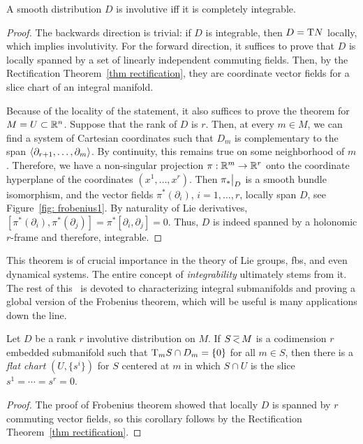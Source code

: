 \begin{thm}\label{thm frobenius}
    A smooth distribution $D$ is involutive iff it is completely integrable.
\end{thm}
\begin{proof}
    The backwards direction is trivial: if $D$ is integrable, then $D=\mathrm{T} N$ locally, which implies involutivity.
    For the forward direction, it suffices to prove that $D$ is locally spanned by a set of linearly independent commuting fields. Then, by the Rectification Theorem~\ref{thm rectification}, they are coordinate vector fields for a slice chart of an integral manifold.

    Because of the locality of the statement, it also suffices to prove the theorem for $M=U\subset \mathbb{R}^n$. Suppose that the rank of $D$ is $r$. Then, at every $m\in M$, we can find a system of Cartesian coordinates such that $D_m$ is complementary to the span $\langle\partial_{r+1},\ldots,\partial_m\rangle$. By continuity, this remains true on some neighborhood of $m$. Therefore, we have a non-singular projection $\pi:\mathbb{R}^m\to\mathbb{R}^r$ onto the coordinate hyperplane of the coordinates $(x^1,\ldots,x^r)$. Then $\restr{\pi_\ast}{D}$ is a smooth bundle isomorphism, and the vector fields $\pi^\ast(\partial_i)$, $i=1,\ldots,r$, locally span $D$, see Figure~\ref{fig: frobenius1}. By naturality of Lie derivatives, $[\pi^\ast(\partial_i),\pi^\ast(\partial_j)]=\pi^\ast[\partial_i,\partial_j]=0.$
    Thus, $D$ is indeed spanned by a holonomic $r$-frame and therefore, integrable.
\end{proof}

This theorem is of crucial importance in the theory of Lie groups, \glspl{fb}, and even dynamical systems. The entire concept of \emph{integrability} ultimately stems from it. The rest of this \sect\ is devoted to characterizing integral submanifolds and proving a global version of the Frobenius theorem, which will be useful is many applications down the line.

\begin{cor}\label{cor 19.13 Lee}
    Let $D$ be a rank $r$ involutive distribution on $M$. If $S\emb M$ is a codimension $r$ embedded submanifold such that $\mathrm{T}_mS\cap D_m=\{0\}$ for all $m\in S$, then there is a \emph{flat chart} $(U,\{s^i\})$ for $S$ centered at $m$ in which $S\cap U$ is the slice $s^1=\cdots=s^r=0$.
\end{cor}
\begin{proof}
    The proof of Frobenius theorem showed that locally $D$ is spanned by $r$ commuting vector fields, so this corollary follows by the Rectification Theorem~\ref{thm rectification}.
\end{proof}

